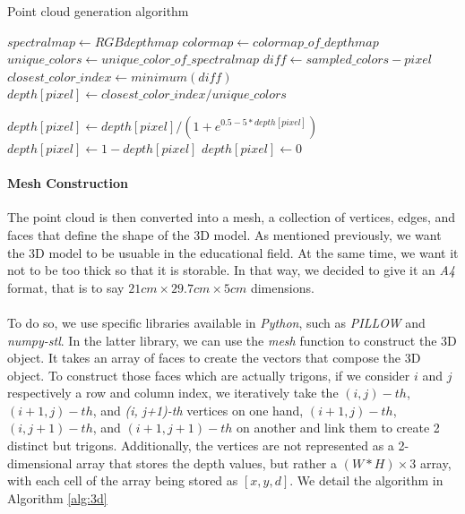 \documentclass[12pt, letterpaper]{article}
\begin{document}
\begin{spacing}{1.15}
\begin{algorithm}
    \caption{Point cloud generation algorithm} \label{alg:pointcloud}
    \begin{algorithmic}
        \State $spectralmap \gets RGB depth map$
        \State $colormap \gets colormap\_of\_depth map$
        \State $unique\_colors \gets unique\_color\_of\_spectralmap$
            \State $diff \gets sampled\_colors - pixel$ 
            \State $closest\_color\_index \gets minimum(diff)$
            \State $depth[pixel] \gets closest\_color\_index / unique\_colors$

            \State $depth[pixel] \gets depth[pixel]/(1 + e ^ {0.5-5*depth[pixel]})$ 
            \State $depth[pixel] \gets 1 - depth[pixel]$
             
                \State $depth[pixel] \gets 0$
            \EndIf
        \EndFor
    \end{algorithmic}
\end{algorithm}


\paragraph{Mesh Construction} The point cloud is then converted into a mesh, a collection of vertices, edges, and faces that define the shape of the 3D model. As mentioned previously, we
want the 3D model to be usuable in the educational field. At the same time, we want it not to be too thick so that it is storable. In that way, we decided to give it an \emph{A4} format, that
is to say $21cm\times29.7cm\times5cm$ dimensions.
\paragraph{}
To do so, we use specific libraries available in \emph{Python}, such as \emph{PILLOW} and \emph{numpy-stl}. In the latter library, we can use the \emph{mesh} function to construct the 3D object.
It takes an array of faces to create the vectors that compose the 3D object. To construct those faces which are actually trigons, if we consider $i$ and $j$ respectively a row and column index,
we iteratively take the $(i,j)-th$, $(i+1,j)-th$, and \emph{(i, j+1)-th} vertices on one hand, $(i+1,j)-th$, $(i,j+1)-th$, and $(i+1, j+1)-th$ on another and link them to create 2 distinct
but trigons. Additionally, the vertices are not represented as a 2-dimensional array that stores the depth values, but rather a \((W*H) \times 3\) array, with each cell of the array being stored
as \([x, y, d]\). We detail the algorithm in Algorithm \ref{alg:3d}


\end{spacing}
\end{document}
